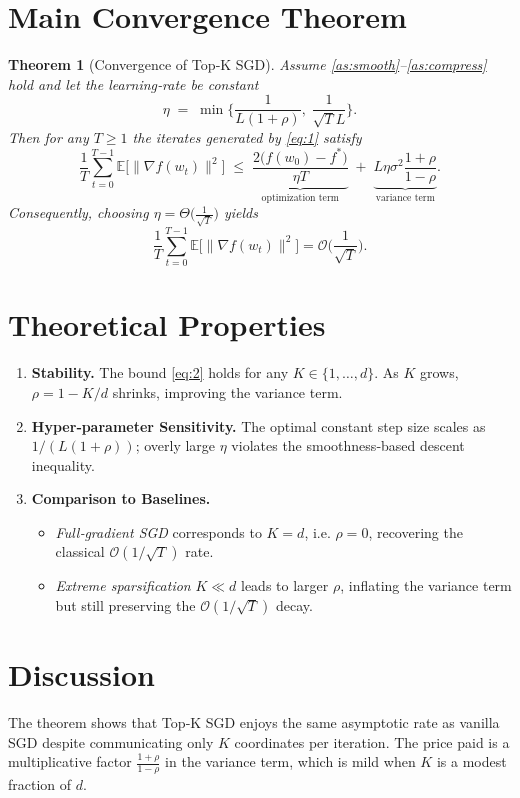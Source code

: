 \documentclass{article}
\newtheorem{theorem}{Theorem}
\begin{document}
\section*{Main Convergence Theorem}
\begin{theorem}[Convergence of Top‑K SGD]\label{thm:main}
Assume \ref{as:smooth}–\ref{as:compress} hold and let the learning‑rate be constant
\[
\eta\;=\;\min\Big\{\frac{1}{L(1+\rho)},\;\frac{1}{\sqrt{T}L}\Big\}.
\]
Then for any $T\ge 1$ the iterates generated by \eqref{eq:1} satisfy
\[
\frac{1}{T}\sum_{t=0}^{T-1}\mathbb{E}\big[\|\nabla f(w_t)\|^{2}\big]
\;\le\;
\underbrace{\frac{2\big(f(w_0)-f^{*}\big)}{\eta T}}_{\text{optimization term}}
\;+\;
\underbrace{L\eta\sigma^{2}\frac{1+\rho}{1-\rho}}_{\text{variance term}}.
\tag{2}
\]
Consequently, choosing $\eta = \Theta\!\big(\frac{1}{\sqrt{T}}\big)$ yields
\[
\frac{1}{T}\sum_{t=0}^{T-1}\mathbb{E}\big[\|\nabla f(w_t)\|^{2}\big]=\mathcal{O}\!\Big(\frac{1}{\sqrt{T}}\Big).
\]
\end{theorem}

\section*{Theoretical Properties}
\begin{enumerate}[label=\arabic*.]
\item \textbf{Stability.} The bound \eqref{eq:2} holds for any $K\in\{1,\dots,d\}$.  As $K$ grows, $\rho=1-K/d$ shrinks, improving the variance term.
\item \textbf{Hyper‑parameter Sensitivity.} The optimal constant step size scales as $1/(L(1+\rho))$; overly large $\eta$ violates the smoothness‑based descent inequality.
\item \textbf{Comparison to Baselines.}
    \begin{itemize}
        \item \emph{Full‑gradient SGD} corresponds to $K=d$, i.e. $\rho=0$, recovering the classical $\mathcal{O}(1/\sqrt{T})$ rate.
        \item \emph{Extreme sparsification} $K\ll d$ leads to larger $\rho$, inflating the variance term but still preserving the $\mathcal{O}(1/\sqrt{T})$ decay.
    \end{itemize}
\end{enumerate}

\section*{Discussion}
The theorem shows that Top‑K SGD enjoys the same asymptotic rate as vanilla SGD despite communicating only $K$ coordinates per iteration.  The price paid is a multiplicative factor $\frac{1+\rho}{1-\rho}$ in the variance term, which is mild when $K$ is a modest fraction of $d$.
\end{document}
